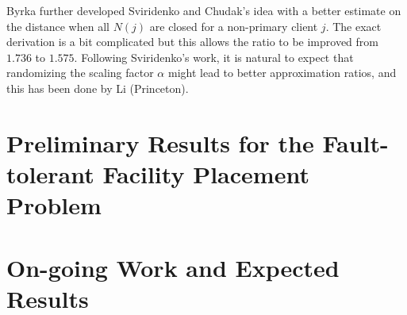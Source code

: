 \documentclass{article}
\begin{document}
Byrka further developed Sviridenko and Chudak's idea with a better
estimate on the distance when all $N(j)$ are closed for a non-primary
client $j$. The exact derivation is a bit complicated but this allows
the ratio to be improved from $1.736$ to $1.575$. Following
Sviridenko's work, it is natural to expect that randomizing the
scaling factor $\alpha$ might lead to better approximation ratios, and
this has been done by Li (Princeton).

\section{Preliminary Results for the Fault-tolerant Facility Placement
  Problem}

\section{On-going Work and Expected Results}
\end{document}
